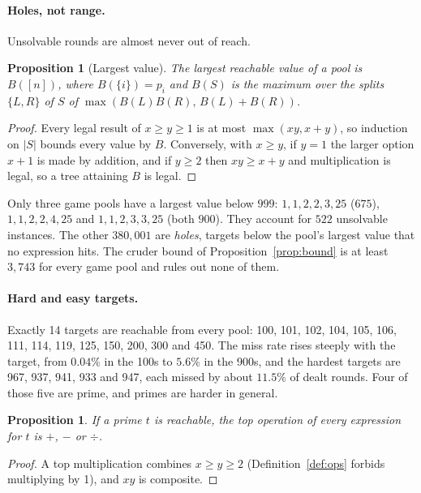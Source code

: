 \documentclass[11pt,a4paper]{article}
\newtheorem{proposition}[theorem]{Proposition}
\theoremstyle{definition}
\theoremstyle{remark}
\begin{document}
\paragraph{Holes, not range.}
Unsolvable rounds are almost never out of reach.

\begin{proposition}[Largest value]\label{prop:max}
The largest reachable value of a pool is $B([n])$, where $B(\{i\}) = p_i$ and $B(S)$ is the maximum over the
splits $\{L, R\}$ of $S$ of $\max(B(L) B(R),\, B(L) + B(R))$.
\end{proposition}

\begin{proof}
Every legal result of $x \ge y \ge 1$ is at most $\max(xy, x + y)$, so induction on $|S|$ bounds every value
by $B$. Conversely, with $x \ge y$, if $y = 1$ the larger option $x + 1$ is made by addition, and if $y \ge 2$
then $xy \ge x + y$ and multiplication is legal, so a tree attaining $B$ is legal.
\end{proof}

Only three game pools have a largest value below $999$: $1, 1, 2, 2, 3, 25$ ($675$), $1, 1, 2, 2, 4, 25$ and
$1, 1, 2, 3, 3, 25$ (both $900$). They account for $522$ unsolvable instances. The other $380{,}001$ are
\emph{holes}, targets below the pool's largest value that no expression hits. The cruder bound of
Proposition~\ref{prop:bound} is at least $3{,}743$ for every game pool and rules out none of them.

\paragraph{Hard and easy targets.}
Exactly 14 targets are reachable from every pool: 100, 101, 102, 104, 105, 106, 111, 114, 119, 125, 150, 200,
300 and 450. The miss rate rises steeply with the target, from $0.04\%$ in the 100s to $5.6\%$ in the 900s,
and the hardest targets are 967, 937, 941, 933 and 947, each missed by about $11.5\%$ of dealt rounds.
Four of those five are prime, and primes are harder in general.

\begin{proposition}\label{prop:prime}
If a prime $t$ is reachable, the top operation of every expression for $t$ is $+$, $-$ or $\div$.
\end{proposition}

\begin{proof}
A top multiplication combines $x \ge y \ge 2$ (Definition~\ref{def:ops} forbids multiplying by 1), and $xy$
is composite.
\end{proof}
\end{document}
